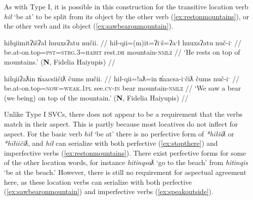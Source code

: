 As with Type I, it is possible in this construction for the transitive location verb \textit{hił} `be at' to be split from its object by the other verb (\ref{ex:restonmountains}), or the other verb and its object (\ref{ex:sawbearonmountain}).

\ex \label{ex:restonmountains}
\begingl
\glpreamble hiłqiimitʔišʔał huuxsʔatu nučii. //
\gla hił-qii=(m)it=ʔiˑš=ʔaˑł huuxsʔatu nuč-iˑ //
\glb be.at-on.top=\textsc{pst}=\textsc{strg.3}=\textsc{habit} rest.\textsc{dr} mountain-\textsc{nmlz} //
\glft `He rests on top of mountains.' (\textbf{N}, Fidelia Haiyupis) //
\endgl
\xe

\ex \label{ex:sawbearonmountain}
\begingl
\glpreamble hiłqiiʔaƛin n̓aacsiičiƛ čums nučii. //
\gla hił-qii=!aƛ=in n̓aacsa-iˑčiƛ čums nuč-iˑ //
\glb be.at-on.top=\textsc{now}=\textsc{weak.1pl} see.\textsc{cv}-\textsc{in} bear mountain-\textsc{nmlz} //
\glft `We saw a bear (we being) on top of the mountain.' (\textbf{N}, Fidelia Haiyupis) //
\endgl
\xe

\begin{comment}
\ex~ \label{ex:hiddeninthewall}
\begingl
\glpreamble huptsaapckʷaƛ hinałc̓ił ʔiiḥmisukʔi p̓atquk. //
\gla hupt-saˑp=ckʷiˑ=!aƛ hina-ałc̓ił ʔiiḥmis=uk=ʔiˑ p̓atquk //
\glb hide-\textsc{mo.caus}=remains.of=\textsc{now} \textsc{empty}-in.wall important=\textsc{poss}=\textsc{art} belongings //
\glft `They hid their belongings in the walls.' (\textbf{B}, Bob Mundy) //
\endgl
\xe
\end{comment}

\begin{comment}
This ``interruption" can occur the other way around, when the location word is intransitive.

\ex \label{ex:gasolinebydoor}
\begingl
\glpreamble ḥuqšiƛ ʔucačiƛ ḥaa yaqʔiitq hiiłsʔat̓uus gasoline.\footnotemark //
\gla ḥuq-šiƛ ʔu-ca-čiƛ ḥaa yaq=ʔiˑtq hił-L.sʔat̓uus gasoline //
\glb tip.over-\textsc{mo} \textsc{x}-go-\textsc{mo} who.what=\textsc{defn.3} be.at-by.the.door gasoline //
\glft `It knocked the gasoline over toward the door..' (\textbf{C}, \textit{tupaat} Julia Lucas) //
\endgl
\xe

\footnotetext{In this dependent construction, `gasoline' is the participant of the predicative relativizer \textit{yaq} `who'. The bracketing is [ḥuqšiƛ ʔucačiƛ]\textsubscript{pred} [ḥaa [yaqʔiitq hiiłsʔat̓uus gasoline] ]\textsubscript{part}}
\end{comment}

Unlike Type I SVCs, there does not appear to be a requirement that the verbs match in their aspect. This is partly because most locatives do not inflect for aspect. For the basic verb \textit{hił} `be at' there is no perfective form of \textit{*hiłšiƛ} or \textit{*hiłiičiƛ}, and \textit{hił} can serialize with both perfective (\ref{ex:stopthere}) and imperfective verbs (\ref{ex:restonmountains}). There exist perfective forms for some of the other location words, for instance \textit{hitinqsaƛ} `go to the beach' from \textit{hitinqis} `be at the beach.' However, there is still no requirement for aspectual agreement here, as these location verbs can serialize with both perfective (\ref{ex:sawbearonmountain}) and imperfective verbs (\ref{ex:speakoutside}).

